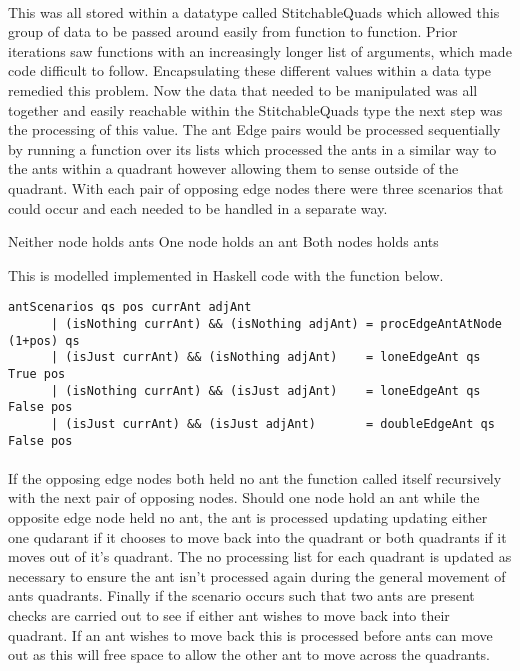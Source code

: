 \documentclass[main.tex]{subfiles}
\begin{document}

\paragraph{}This was all stored within a datatype called StitchableQuads which allowed this group of data to be passed around easily from function to function. Prior iterations saw functions with an increasingly longer list of arguments, which made code difficult to follow. Encapsulating these different values within a data type remedied this problem. Now the data that needed to be manipulated was all together and easily reachable within the StitchableQuads type the next step was the processing of this value. The ant Edge pairs would be processed sequentially by running a function over its lists which processed the ants in a similar way to the ants within a quadrant however allowing them to sense outside of the quadrant. With each pair of opposing edge nodes there were three scenarios that could occur and each needed to be handled in a separate way.

Neither node holds ants
One node holds an ant
Both nodes holds ants

This is modelled implemented in Haskell code with the function below.
\begin{lstlisting}
antScenarios qs pos currAnt adjAnt
      | (isNothing currAnt) && (isNothing adjAnt) = procEdgeAntAtNode (1+pos) qs
      | (isJust currAnt) && (isNothing adjAnt)    = loneEdgeAnt qs True pos
      | (isNothing currAnt) && (isJust adjAnt)    = loneEdgeAnt qs False pos
      | (isJust currAnt) && (isJust adjAnt)       = doubleEdgeAnt qs False pos
\end{lstlisting}

\paragraph{}If the opposing edge nodes both held no ant the function called itself recursively with the next pair of opposing nodes. Should one node hold an ant while the opposite edge node held no ant, the ant is processed updating updating either one qudarant if it chooses to move back into the quadrant or both quadrants if it moves out of it's quadrant. The no processing list for each quadrant is updated as necessary to ensure the ant isn't processed again during the general movement of ants quadrants. Finally if the scenario occurs such that two ants are present checks are carried out to see if either ant wishes to move back into their quadrant. If an ant wishes to move back this is processed before ants can move out as this will free space to allow the other ant to move across the quadrants.
\end{document}
